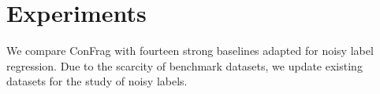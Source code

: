 \documentclass{article}
\theoremstyle{plain}
\theoremstyle{definition}
\theoremstyle{remark}
\begin{document}
\begin{table}[th!]
\begin{center}
\begin{small}
\begin{tabular}{lcccccccccccc}
        \bottomrule
    \end{tabular}
    \end{small}
    \end{center}
    \label{tab:main_mrae}
    \vskip -0.15in
\end{table}


\section{Experiments}\label{sec:experiments}
\vskip -0.05in
We compare ConFrag with fourteen strong baselines adapted for noisy label regression.
Due to the scarcity of benchmark datasets, we update existing datasets for the study of noisy labels.
\end{document}
